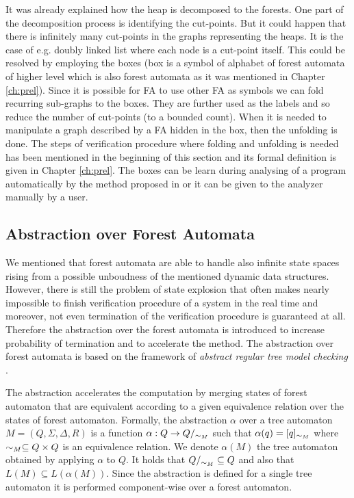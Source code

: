 It was already explained how the heap is decomposed to the forests.
One part of the decomposition process is identifying the cut-points.
But it could happen that there is infinitely many cut-points in the graphs representing the heaps.
It is the case of e.g. doubly linked list where each node is a cut-point itself.
This could be resolved by employing the boxes (box is a symbol of alphabet of forest automata
of higher level which is also forest automata as it was mentioned in Chapter \ref{ch:prel}).
Since it is possible for FA to use other FA as symbols we can fold recurring sub-graphs to the boxes.
They are further used as the labels
and so reduce the number of cut-points (to a bounded count).
When it is needed to manipulate a graph described by a FA hidden in the box, then the unfolding is done.
The steps of verification procedure where folding and unfolding is needed has been mentioned in the beginning of this section
and its formal definition is given in Chapter \ref{ch:prel}.
The boxes can be learn during analysing of a program automatically by the method proposed in \cite{forester13} or
it can be given to the analyzer manually by a user.

\subsection{Abstraction over Forest Automata}
\label{subsec:abstraction}

We mentioned that forest automata are able to handle also infinite state spaces
rising from a possible unboudness of the mentioned dynamic data structures.
However, there is still the problem of state explosion that often makes
nearly impossible to finish verification procedure of a system in the real time
and moreover, not even termination of the verification procedure is guaranteed at all.
Therefore the abstraction over the forest automata is introduced to increase probability of termination
and to accelerate the method.
The abstraction over forest automata is based on the framework of \emph{abstract regular tree model checking} \cite{artmc}.

The abstraction accelerates the computation by merging states of forest automaton that are equivalent
according to a given equivalence relation over the states of forest automaton.
Formally, the abstraction $\alpha$ over a tree automaton $M=(Q, \Sigma, \Delta, R)$ is
a function $\alpha: Q \rightarrow Q/_{\sim_M}$ such that $\alpha(q) = [q]_{\sim_M}$
where $\sim_M \subseteq Q \times Q$ is an equivalence relation.
We denote $\alpha(M)$ the tree automaton obtained by applying $\alpha$ to $Q$.
It holds that $Q/_{\sim_M} \subseteq Q$ and also that $L(M) \subseteq L(\alpha(M))$.
Since the abstraction is defined for a single tree automaton
it is performed component-wise over a forest automaton.

